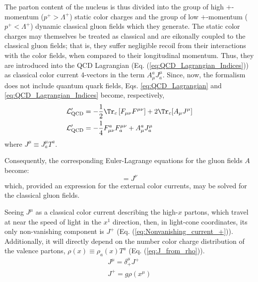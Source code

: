 The parton content of the nucleus is thus divided into the group of high $+$-momentum ($p^+ > \Lambda^+$) static color charges and the group of low $+$-momentum ($p^+ < \Lambda^+$) dynamic classical gluon fields which they generate. The static color charges may themselves be treated as classical \cite{Albacete_2014,McLerran_1994_classic_source}
and are eikonally coupled to the classical gluon fields; that is, they suffer negligible recoil from their interactions with the color fields, when compared to their longitudinal momentum.\cite{Gelis_2010} Thus, they are introduced into the \gls{QCD} Lagrangian (Eq. (\ref{eq:QCD_Lagrangian_Indices})) as classical color current 4-vectors in the term $A_\mu^a J^\mu_a$. Since, now, the formalism does not include quantum quark fields, Eqs. \ref{eq:QCD_Lagrangian} and \ref{eq:QCD_Lagrangian_Indices} become, respectively,%
\begin{align}
	\mathcal{L}_\text{QCD}' & = - \frac{1}{2} \Tr_c \left[ F_{\mu \nu} F^{\mu \nu} \right] + 2 \Tr_c [A_\mu J^\mu] \\
	\mathcal{L}_\text{QCD}' & =  - \frac{1}{4} F_{\mu \nu}^a F^{\mu \nu}_a + A_\mu^a J^\mu_a
\end{align}
where $J^\mu \equiv J^\mu_a T^a$.

Consequently, the corresponding Euler-Lagrange equations for the gluon fields $A$ become:
\begin{equation}
	[D_\mu, F^{\mu \nu}] = J^\nu
\end{equation}
which, provided an expression for the external color currents, may be solved for the classical gluon fields.

Seeing $J^\mu$ as a classical color current describing the high-$x$ partons, which travel at near the speed of light in the $x^1$ direction, then, in light-cone coordinates, its only non-vanishing component is $J^+$ (Eq. (\ref{eq:Nonvanishing_current_+})). Additionally, it will directly depend on the number color charge distribution of the valence partons, $\rho (x) \equiv \rho_a(x) T^a$ (Eq. (\ref{eq:J_from_rho})).
\begin{gather}
	J^\mu = \delta^\mu_+ J^+ \label{eq:Nonvanishing_current_+} \\
	J^+ = g \rho (x^\mu) \label{eq:J_from_rho}
\end{gather}

